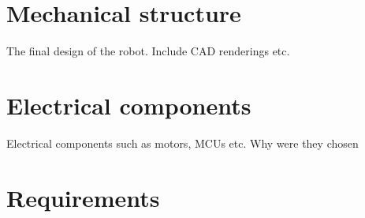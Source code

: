 \section*{Mechanical structure}
The final design of the robot. Include CAD renderings etc. 
\section*{Electrical components}
Electrical components such as motors, MCUs etc. Why were they chosen

\section*{Requirements}
